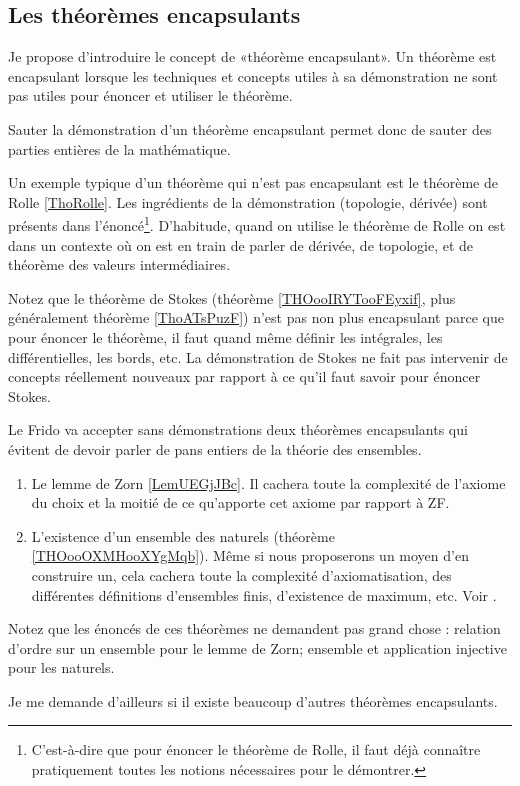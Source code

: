 \subsection{Les théorèmes encapsulants}
\label{SUBooThmEncapsulants}

\begin{normaltext}\label{NorooThmEncapsulants}
	Je propose d'introduire le concept de «théorème encapsulant». Un théorème est encapsulant lorsque les techniques et concepts utiles à sa démonstration ne sont pas utiles pour énoncer et utiliser le théorème.

	Sauter la démonstration d'un théorème encapsulant permet donc de sauter des parties entières de la mathématique.

	Un exemple typique d'un théorème qui n'est pas encapsulant est le théorème de Rolle \ref{ThoRolle}. Les ingrédients de la démonstration (topologie, dérivée) sont présents dans l'énoncé\footnote{C'est-à-dire que pour énoncer le théorème de Rolle, il faut déjà connaître pratiquement toutes les notions nécessaires pour le démontrer.}. D'habitude, quand on utilise le théorème de Rolle on est dans un contexte où on est en train de parler de dérivée, de topologie, et de théorème des valeurs intermédiaires.

	Notez que le théorème de Stokes (théorème \ref{THOooIRYTooFEyxif},  plus généralement théorème \ref{ThoATsPuzF}) n'est pas non plus encapsulant parce que pour énoncer le théorème, il faut quand même définir les intégrales, les différentielles, les bords, etc. La démonstration de Stokes ne fait pas intervenir de concepts réellement nouveaux par rapport à ce qu'il faut savoir pour énoncer Stokes.

	Le Frido va accepter sans démonstrations deux théorèmes encapsulants qui évitent de devoir parler de pans entiers de la théorie des ensembles.

	\begin{enumerate}
		\item
		      Le lemme de Zorn \ref{LemUEGjJBc}. Il cachera toute la complexité de l'axiome du choix et la moitié de ce qu'apporte cet axiome par rapport à ZF.

		\item
		      L'existence d'un ensemble des naturels (théorème \ref{THOooOXMHooXYgMqb}). Même si nous proposerons un moyen d'en construire un, cela cachera toute la complexité d'axiomatisation, des différentes définitions d'ensembles finis, d'existence de maximum, etc. Voir \cite{BIBooGVVDooDoQSaM,BIBooFGIWooMkmaKH}.
	\end{enumerate}

	Notez que les énoncés de ces théorèmes ne demandent pas grand chose : relation d'ordre sur un ensemble pour le lemme de Zorn; ensemble et application injective pour les naturels.

	Je me demande d'ailleurs si il existe beaucoup d'autres théorèmes encapsulants.
\end{normaltext}


